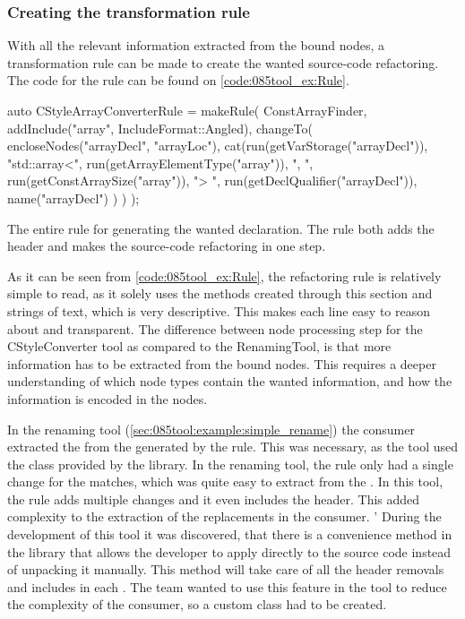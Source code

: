 \subsubsection*{Creating the transformation rule}

With all the relevant information extracted from the bound nodes, a transformation rule can be made to create the wanted source-code refactoring. The code for the rule can be found on \cref{code:085tool_ex:Rule}.

\begin{listing}[H]
    \begin{cppcode}
auto CStyleArrayConverterRule = makeRule(
    ConstArrayFinder,
    {
        addInclude("array", IncludeFormat::Angled),
        changeTo(
            encloseNodes("arrayDecl", "arrayLoc"),
            cat(run(getVarStorage("arrayDecl")),
                "std::array<",
                run(getArrayElementType("array")),
                ", ",
                run(getConstArraySize("array")),
                "> ",
                run(getDeclQualifier("arrayDecl")),
                name("arrayDecl")
            )
        )
    });
    \end{cppcode}
    \caption{The entire rule for generating the wanted  declaration. The rule both adds the  header and makes the source-code refactoring in one step.}
    \label{code:085tool_ex:Rule}
\end{listing}

As it can be seen from \cref{code:085tool_ex:Rule}, the refactoring rule is relatively simple to read, as it solely uses the methods created through this section and strings of text, which is very descriptive. This makes each line easy to reason about and transparent. The difference between node processing step for the CStyleConverter tool as compared to the RenamingTool, is that more information has to be extracted from the bound nodes. This requires a deeper understanding of which node types contain the wanted information, and how the information is encoded in the nodes.

In the renaming tool (\cref{sec:085tool:example:simple_rename}) the  consumer extracted the  from the  generated by the rule. This was necessary, as the tool used the  class provided by the library. In the renaming tool, the rule only had a single change for the matches, which was quite easy to extract from the . In this tool, the rule adds multiple changes and it even includes the  header. This added complexity to the extraction of the replacements in the consumer. 
'
During the development of this tool it was discovered, that there is a convenience method in the library that allows the developer to apply  directly to the source code instead of unpacking it manually. This method will take care of all the header removals and includes in each . The team wanted to use this feature in the tool to reduce the complexity of the consumer, so a custom  class had to be created.

